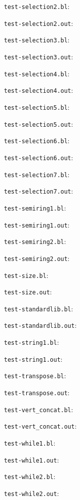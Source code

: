 \verb=test-selection2.bl=:

\verb=test-selection2.out=:

\verb=test-selection3.bl=:

\verb=test-selection3.out=:

\verb=test-selection4.bl=:

\verb=test-selection4.out=:

\verb=test-selection5.bl=:

\verb=test-selection5.out=:

\verb=test-selection6.bl=:

\verb=test-selection6.out=:

\verb=test-selection7.bl=:

\verb=test-selection7.out=:

\verb=test-semiring1.bl=:

\verb=test-semiring1.out=:

\verb=test-semiring2.bl=:

\verb=test-semiring2.out=:

\verb=test-size.bl=:

\verb=test-size.out=:

\verb=test-standardlib.bl=:

\verb=test-standardlib.out=:

\verb=test-string1.bl=:

\verb=test-string1.out=:

\verb=test-transpose.bl=:

\verb=test-transpose.out=:

\verb=test-vert_concat.bl=:

\verb=test-vert_concat.out=:

\verb=test-while1.bl=:

\verb=test-while1.out=:

\verb=test-while2.bl=:

\verb=test-while2.out=:

